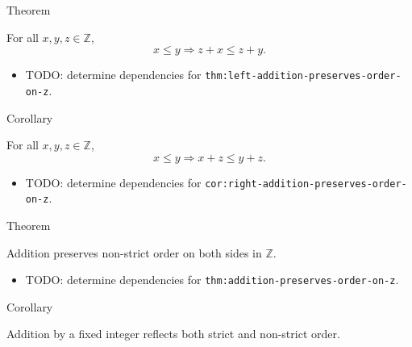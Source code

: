 \begin{theorembox}{Theorem}
\begin{theorem}
\label{thm:left-addition-preserves-order-on-z}
For all $x,y,z\in\mathbb{Z}$,
\[
x\le y \Longrightarrow z+x\le z+y.
\]
\end{theorem}
\end{theorembox}

\begin{dependencies}
\begin{itemize}
  \item TODO: determine dependencies for \texttt{thm:left-addition-preserves-order-on-z}.
\end{itemize}
\end{dependencies}

\begin{corollarybox}{Corollary}
\begin{corollary}
\label{cor:right-addition-preserves-order-on-z}
For all $x,y,z\in\mathbb{Z}$,
\[
x\le y \Longrightarrow x+z\le y+z.
\]
\end{corollary}
\end{corollarybox}

\begin{dependencies}
\begin{itemize}
  \item TODO: determine dependencies for \texttt{cor:right-addition-preserves-order-on-z}.
\end{itemize}
\end{dependencies}

\begin{theorembox}{Theorem}
\begin{theorem}
\label{thm:addition-preserves-order-on-z}
Addition preserves non-strict order on both sides in $\mathbb{Z}$.
\end{theorem}
\end{theorembox}

\begin{dependencies}
\begin{itemize}
  \item TODO: determine dependencies for \texttt{thm:addition-preserves-order-on-z}.
\end{itemize}
\end{dependencies}

\begin{corollarybox}{Corollary}
\begin{corollary}
\label{cor:addition-reflects-order-on-z}
Addition by a fixed integer reflects both strict and non-strict order.
\end{corollary}
\end{corollarybox}

